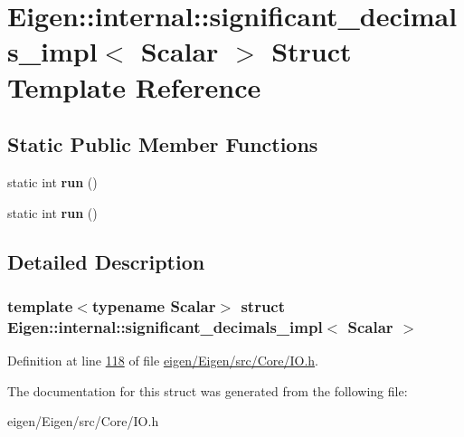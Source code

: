 \hypertarget{struct_eigen_1_1internal_1_1significant__decimals__impl}{}\section{Eigen\+:\+:internal\+:\+:significant\+\_\+decimals\+\_\+impl$<$ Scalar $>$ Struct Template Reference}
\label{struct_eigen_1_1internal_1_1significant__decimals__impl}
\subsection*{Static Public Member Functions}
\begin{DoxyCompactItemize}
\item 
\mbox{\label{struct_eigen_1_1internal_1_1significant__decimals__impl_a5067c92af24f8102e8b41e3716db4894}} 
static int {\bfseries run} ()
\item 
\mbox{\label{struct_eigen_1_1internal_1_1significant__decimals__impl_a5067c92af24f8102e8b41e3716db4894}} 
static int {\bfseries run} ()
\end{DoxyCompactItemize}


\subsection{Detailed Description}
\subsubsection*{template$<$typename Scalar$>$\newline
struct Eigen\+::internal\+::significant\+\_\+decimals\+\_\+impl$<$ Scalar $>$}



Definition at line \hyperlink{eigen_2_eigen_2src_2_core_2_i_o_8h_source_l00118}{118} of file \hyperlink{eigen_2_eigen_2src_2_core_2_i_o_8h_source}{eigen/\+Eigen/src/\+Core/\+I\+O.\+h}.



The documentation for this struct was generated from the following file\+:\begin{DoxyCompactItemize}
\item 
eigen/\+Eigen/src/\+Core/\+I\+O.\+h\end{DoxyCompactItemize}
